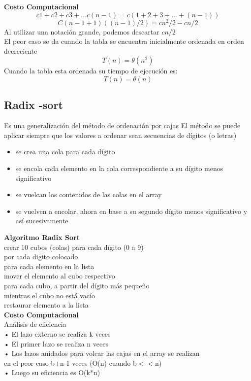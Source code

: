 \documentclass{article}
\begin{document}
\textbf{Costo Computacional}\\
\begin{equation}
c1+c2+c3+...c(n-1)=c(1+2+3+...+(n-1))
\end{equation}
\begin{equation}
C(n-1+1)((n-1)/2)=cn^2/2-cn/2
\end{equation}
Al utilizar una notación grande, podemos descartar $cn/2$\\
El peor caso se da cuando la tabla se encuentra inicialmente ordenada en orden decreciente
\begin{equation}
T(n)=\theta(n^2)
\end{equation}
Cuando la tabla esta ordenada su tiempo de ejecución es:
\begin{equation}
T(n)= \theta(n)
\end{equation}
\subsection{Radix -sort}
Es una generalización del método de ordenación por cajas
El método se puede aplicar siempre que los valores a ordenar sean secuencias de dígitos (o letras)
\begin{itemize}
    \item se crea una cola para cada dígito
    \item se encola cada elemento en la cola correspondiente a su dígito menos significativo
    \item se vuelcan los contenidos de las colas en el array
    \item se vuelven a encolar, ahora en base a su segundo dígito menos significativo y así sucesivamente
\end{itemize}

\textbf{Algoritmo Radix Sort}\\
\tab crear 10 cubos (colas) para cada dígito (0 a 9)\\
\tab por cada digito colocado\\
\tab   para cada elemento en la lista\\
\tab \tab     mover el elemento al cubo respectivo\\
\tab   para cada cubo, a partir del dígito más pequeño\\
\tab \tab     mientras el cubo no está vacío\\
\tab \tab      restaurar elemento a la lista\\


\textbf{Costo Computacional}\\
Análisis de eficiencia\\
• El lazo externo se realiza k veces\\
• El primer lazo se realiza n veces\\
• Los lazos anidados para volcar las cajas en el array se realizan\\
en el peor caso b+n-1 veces (O(n) cuando b$<<$n)\\
• Luego su eficiencia es O(k*n)
\pagestyle{fancy}
\fancyhf{}
\rfoot{\thepage}{}
\end{document}
